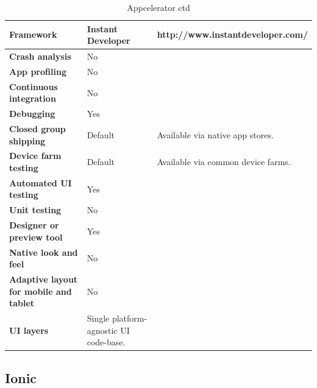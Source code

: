 \documentclass[english,master,public,dept460,male,cpdeclaration,oneside]{diploma}
\begin{document}
\begin{table}[!h]
	\centering
	\caption{Appcelerator ctd}
	\begin{tabular}{p{} | p{} | p{}}
		\toprule		
		\textbf{Framework} & \textbf{Instant Developer} & http://www.instantdeveloper.com/ \\
		\midrule
		\textbf{Crash analysis} & No & \\			
		\midrule
		\textbf{App profiling} & No & \\			
		\midrule
		\textbf{Continuous integration} & No & \\			
		\midrule
		\textbf{Debugging} & Yes & \\			
		\midrule
		\textbf{Closed group shipping} & Default & Available via native app stores. \\			
		\midrule
		\textbf{Device farm testing} & Default & Available via common device farms. \\			
		\midrule
		\textbf{Automated UI testing} & Yes & \\			
		\midrule
		\textbf{Unit testing} & No & \\			
		\midrule
		\textbf{Designer or preview tool} & Yes & \\			
		\midrule
		\textbf{Native look and feel} & No & \\			
		\midrule
		\textbf{Adaptive layout for mobile and tablet} & No & \\			
		\midrule		
		\textbf{UI layers} & Single platform-agnostic UI code-base. &  \\			
		\midrule
	\end{tabular}
\end{table}

\clearpage
\subsection{Ionic}
\end{document}
